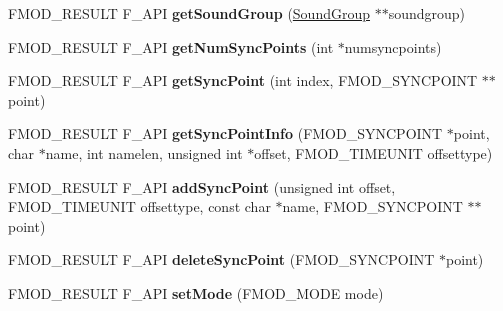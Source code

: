 \begin{DoxyCompactItemize}
\item 
\hypertarget{class_f_m_o_d_1_1_sound_a146bf9b59d99685b313f95e3460a4b8b}{F\-M\-O\-D\-\_\-\-R\-E\-S\-U\-L\-T F\-\_\-\-A\-P\-I {\bfseries get\-Sound\-Group} (\hyperlink{class_f_m_o_d_1_1_sound_group}{Sound\-Group} $\ast$$\ast$soundgroup)}\label{class_f_m_o_d_1_1_sound_a146bf9b59d99685b313f95e3460a4b8b}

\item 
\hypertarget{class_f_m_o_d_1_1_sound_a3a8c9fd2fb487a3b3a66952f09840fbf}{F\-M\-O\-D\-\_\-\-R\-E\-S\-U\-L\-T F\-\_\-\-A\-P\-I {\bfseries get\-Num\-Sync\-Points} (int $\ast$numsyncpoints)}\label{class_f_m_o_d_1_1_sound_a3a8c9fd2fb487a3b3a66952f09840fbf}

\item 
\hypertarget{class_f_m_o_d_1_1_sound_ab091d9a05e5f30f7a3ffbe1503335d32}{F\-M\-O\-D\-\_\-\-R\-E\-S\-U\-L\-T F\-\_\-\-A\-P\-I {\bfseries get\-Sync\-Point} (int index, F\-M\-O\-D\-\_\-\-S\-Y\-N\-C\-P\-O\-I\-N\-T $\ast$$\ast$point)}\label{class_f_m_o_d_1_1_sound_ab091d9a05e5f30f7a3ffbe1503335d32}

\item 
\hypertarget{class_f_m_o_d_1_1_sound_a99aa787828a6fa111ba2663a3c35b6e0}{F\-M\-O\-D\-\_\-\-R\-E\-S\-U\-L\-T F\-\_\-\-A\-P\-I {\bfseries get\-Sync\-Point\-Info} (F\-M\-O\-D\-\_\-\-S\-Y\-N\-C\-P\-O\-I\-N\-T $\ast$point, char $\ast$name, int namelen, unsigned int $\ast$offset, F\-M\-O\-D\-\_\-\-T\-I\-M\-E\-U\-N\-I\-T offsettype)}\label{class_f_m_o_d_1_1_sound_a99aa787828a6fa111ba2663a3c35b6e0}

\item 
\hypertarget{class_f_m_o_d_1_1_sound_abb46f258c1ac4563f20b17a4647b0dc0}{F\-M\-O\-D\-\_\-\-R\-E\-S\-U\-L\-T F\-\_\-\-A\-P\-I {\bfseries add\-Sync\-Point} (unsigned int offset, F\-M\-O\-D\-\_\-\-T\-I\-M\-E\-U\-N\-I\-T offsettype, const char $\ast$name, F\-M\-O\-D\-\_\-\-S\-Y\-N\-C\-P\-O\-I\-N\-T $\ast$$\ast$point)}\label{class_f_m_o_d_1_1_sound_abb46f258c1ac4563f20b17a4647b0dc0}

\item 
\hypertarget{class_f_m_o_d_1_1_sound_a21e86318ac39e576111e642b57db4187}{F\-M\-O\-D\-\_\-\-R\-E\-S\-U\-L\-T F\-\_\-\-A\-P\-I {\bfseries delete\-Sync\-Point} (F\-M\-O\-D\-\_\-\-S\-Y\-N\-C\-P\-O\-I\-N\-T $\ast$point)}\label{class_f_m_o_d_1_1_sound_a21e86318ac39e576111e642b57db4187}

\item 
\hypertarget{class_f_m_o_d_1_1_sound_a8410551349a26de45abe6a931ea6965a}{F\-M\-O\-D\-\_\-\-R\-E\-S\-U\-L\-T F\-\_\-\-A\-P\-I {\bfseries set\-Mode} (F\-M\-O\-D\-\_\-\-M\-O\-D\-E mode)}\label{class_f_m_o_d_1_1_sound_a8410551349a26de45abe6a931ea6965a}


\end{DoxyCompactItemize}
